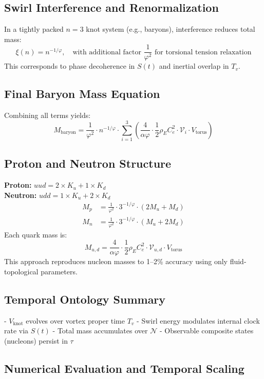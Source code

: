 \documentclass[12pt]{article}
\begin{document}
\subsection{Swirl Interference and Renormalization}
In a tightly packed $n=3$ knot system (e.g., baryons), interference reduces total mass:
\[
\xi(n) = n^{-1/\varphi}, \quad \text{with additional factor } \frac{1}{\varphi^2} \text{ for torsional tension relaxation}
\]
This corresponds to phase decoherence in $S(t)$ and inertial overlap in $T_v$.

\subsection{Final Baryon Mass Equation}
Combining all terms yields:
\[
\boxed{
M_{\text{baryon}} = \frac{1}{\varphi^2} \cdot n^{-1/\varphi} \cdot \sum_{i=1}^{3} \left( \frac{4}{\alpha \varphi} \cdot \frac{1}{2} \rho_{\scriptscriptstyle\boldsymbol\!E}C_e^2 \cdot \mathcal{V}_i \cdot V_{\text{torus}} \right)
}
\]

\subsection{Proton and Neutron Structure}
\textbf{Proton:} $uud = 2\times K_u + 1\times K_d$ \\
\textbf{Neutron:} $udd = 1\times K_u + 2\times K_d$
\[
\begin{aligned}
M_p &= \frac{1}{\varphi^2} \cdot 3^{-1/\varphi} \cdot (2M_u + M_d) \\
M_n &= \frac{1}{\varphi^2} \cdot 3^{-1/\varphi} \cdot (M_u + 2M_d)
\end{aligned}
\]
Each quark mass is:
\[
M_{u,d} = \frac{4}{\alpha \varphi} \cdot \frac{1}{2} \rho_{\scriptscriptstyle\boldsymbol\!E}C_e^2 \cdot \mathcal{V}_{u,d} \cdot V_{\text{torus}}
\]
This approach reproduces nucleon masses to 1–2\% accuracy using only fluid-topological parameters.

\subsection*{Temporal Ontology Summary}
- $V_{\text{knot}}$ evolves over vortex proper time $T_v$
- Swirl energy modulates internal clock rate via $S(t)$
- Total mass accumulates over $\mathcal{N}$
- Observable composite states (nucleons) persist in $\tau$


\subsection{Numerical Evaluation and Temporal Scaling}
\end{document}
